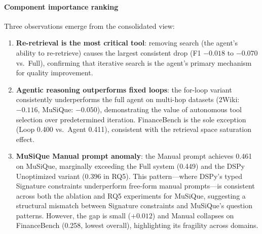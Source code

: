 \paragraph{Component importance ranking}
Three observations emerge from the consolidated view:
\begin{enumerate}
    \item \textbf{Re-retrieval is the most critical tool}: removing search (the agent's ability to re-retrieve) causes the largest consistent drop (F1 $-0.018$ to $-0.070$ vs.\ Full), confirming that iterative search is the agent's primary mechanism for quality improvement.

    \item \textbf{Agentic reasoning outperforms fixed loops}: the for-loop variant consistently underperforms the full agent on multi-hop datasets (2Wiki: $-0.116$, MuSiQue: $-0.050$), demonstrating the value of autonomous tool selection over predetermined iteration.
    FinanceBench is the sole exception (Loop 0.400 vs.\ Agent 0.411), consistent with the retrieval space saturation effect.

    \item \textbf{MuSiQue Manual prompt anomaly}: the Manual prompt achieves 0.461 on MuSiQue, marginally exceeding the Full system (0.449) and the DSPy Unoptimized variant (0.396 in RQ5).
    This pattern---where DSPy's typed Signature constraints underperform free-form manual prompts---is consistent across both the ablation and RQ5 experiments for MuSiQue, suggesting a structural mismatch between Signature constraints and MuSiQue's question patterns.
    However, the gap is small ($+0.012$) and Manual collapses on FinanceBench (0.258, lowest overall), highlighting its fragility across domains.
\end{enumerate}

